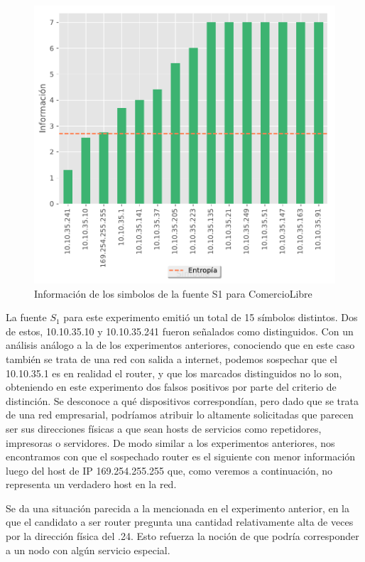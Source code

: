 \begin{figure}[H]
  \begin{center}
    \includegraphics[scale = 0.5]{img/ECommerce-information-S1.pdf}
    \caption{Información de los simbolos de la fuente S1 para ComercioLibre}
    \label{informacion_ecommerce}
  \end{center}
\end{figure}

La fuente $S_1$ para este experimento emitió un total de 15 símbolos distintos. Dos de estos, 10.10.35.10 y 10.10.35.241 fueron señalados como distinguidos. Con un análisis análogo a la de los experimentos anteriores, conociendo que en este caso también se trata de una red con salida a internet, podemos sospechar que el 10.10.35.1 es en realidad el router, y que los marcados distinguidos no lo son, obteniendo en este experimento dos falsos positivos por parte del criterio de distinción. Se desconoce a qué dispositivos correspondían, pero dado que se trata de una red empresarial, podríamos atribuir lo altamente solicitadas que parecen ser sus direcciones físicas a que sean hosts de servicios como repetidores, impresoras o servidores. De modo similar a los experimentos anteriores, nos encontramos con que el sospechado router es el siguiente con menor información luego del host de IP 169.254.255.255 que, como veremos a continuación, no representa un verdadero host en la red.

Se da una situación parecida a la mencionada en el experimento anterior, en la que el candidato a ser router pregunta una cantidad relativamente alta de veces por la dirección física del .24. Esto refuerza la noción de que podría corresponder a un nodo con algún servicio especial.

